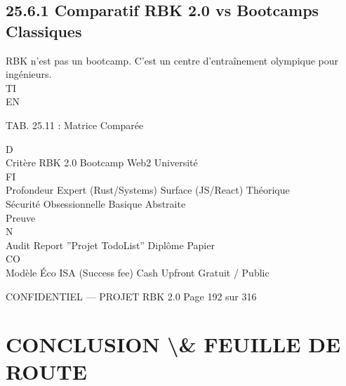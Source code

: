 \subsection{25.6.1 Comparatif RBK 2.0 vs Bootcamps Classiques}
RBK n’est pas un bootcamp. C’est un centre d’entraînement olympique pour ingénieurs.\\
\vspace{0.5em}
\vspace{0.5em}
\vspace{0.5em}
\vspace{0.5em}
TI\\
EN\\
\begin{center}\begin{tabular}TAB. 25.11 : Matrice Comparée\end{tabular}\end{center}
\vspace{0.5em}
\vspace{0.5em}
\vspace{0.5em}
\vspace{0.5em}
D\\
Critère    RBK 2.0               Bootcamp Web2 Université\\
\vspace{0.5em}
\vspace{0.5em}
\vspace{0.5em}
\vspace{0.5em}
FI\\
Profondeur Expert (Rust/Systems) Surface (JS/React) Théorique\\
Sécurité   Obsessionnelle        Basique            Abstraite\\
Preuve\\
N\\
Audit Report          ”Projet TodoList” Diplôme Papier\\
CO\\
Modèle Éco ISA (Success fee)     Cash Upfront       Gratuit / Public\\
\vspace{0.5em}
\vspace{0.5em}
\vspace{0.5em}
\vspace{0.5em}
\begin{confidential}CONFIDENTIEL — PROJET RBK 2.0                                   Page 192 sur 316\end{confidential}
\section{CONCLUSION \textbackslash{}& FEUILLE DE ROUTE}
\vspace{0.5em}
\vspace{0.5em}
